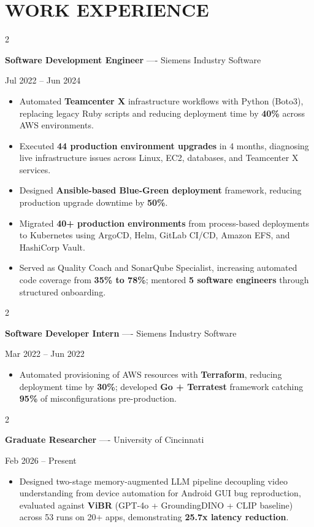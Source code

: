 \documentclass[10pt, letterpaper]{article}
\newenvironment{highlights}{
    \begin{itemize}[
        topsep=0.10 cm,
        parsep=0.06 cm,
        partopsep=0pt,
        itemsep=0.06 cm,
        leftmargin=12pt
    ]
}{
    \end{itemize}
}
\newenvironment{twocolentry}[2][]{
    \onecolentry
    \def\secondColumn{#2}
    \setcolumnwidth{\fill, 4.5 cm}
    \begin{paracol}{2}
}{
    \switchcolumn \raggedleft \secondColumn
    \end{paracol}
    \endonecolentry
}
\begin{document}
\section{WORK EXPERIENCE}
\begin{twocolentry}{Jul 2022 -- Jun 2024}
\textbf{Software Development Engineer} ---- Siemens Industry Software
\end{twocolentry}
\begin{highlights}
  \item Automated \textbf{Teamcenter X} infrastructure workflows with Python (Boto3), replacing legacy Ruby scripts and reducing deployment time by \textbf{40\%} across AWS environments.
  \item Executed \textbf{44 production environment upgrades} in 4 months, diagnosing live infrastructure issues across Linux, EC2, databases, and Teamcenter X services.
  \item Designed \textbf{Ansible-based Blue-Green deployment} framework, reducing production upgrade downtime by \textbf{50\%}.
  \item Migrated \textbf{40+ production environments} from process-based deployments to Kubernetes using ArgoCD, Helm, GitLab CI/CD, Amazon EFS, and HashiCorp Vault.
  \item Served as Quality Coach and SonarQube Specialist, increasing automated code coverage from \textbf{35\% to 78\%}; mentored \textbf{5 software engineers} through structured onboarding.
\end{highlights}

\vspace{0.15 cm}

\begin{twocolentry}{Mar 2022 -- Jun 2022}
\textbf{Software Developer Intern} ---- Siemens Industry Software
\end{twocolentry}
\begin{highlights}
  \item Automated provisioning of AWS resources with \textbf{Terraform}, reducing deployment time by \textbf{30\%}; developed \textbf{Go + Terratest} framework catching \textbf{95\%} of misconfigurations pre-production.
\end{highlights}

\vspace{0.15 cm}

\begin{twocolentry}{Feb 2026 -- Present}
\textbf{Graduate Researcher} ---- University of Cincinnati
\end{twocolentry}
\begin{highlights}
  \item Designed two-stage memory-augmented LLM pipeline decoupling video understanding from device automation for Android GUI bug reproduction, evaluated against \textbf{ViBR} (GPT-4o + GroundingDINO + CLIP baseline) across 53 runs on 20+ apps, demonstrating \textbf{25.7x latency reduction}.
\end{highlights}
\end{document}
